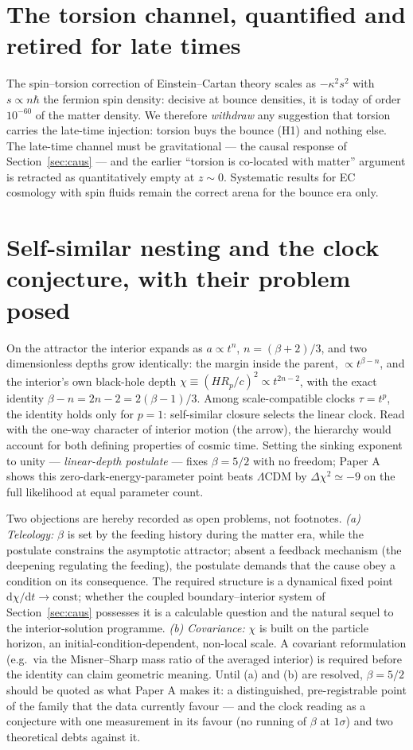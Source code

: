 \documentclass[11pt]{article}
\begin{document}
\section{The torsion channel, quantified and retired for late times}
The spin--torsion correction of Einstein--Cartan theory scales as $-\kappa^2 s^2$ with $s \propto n\hbar$ the fermion spin density: decisive at bounce densities, it is today of order $10^{-60}$ of the matter density. We therefore \emph{withdraw} any suggestion that torsion carries the late-time injection: torsion buys the bounce (H1) and nothing else. The late-time channel must be gravitational --- the causal response of Section~\ref{sec:caus} --- and the earlier ``torsion is co-located with matter'' argument is retracted as quantitatively empty at $z \sim 0$. Systematic results for EC cosmology with spin fluids \cite{ECtheorems} remain the correct arena for the bounce era only.

\section{Self-similar nesting and the clock conjecture, with their problem posed}
On the attractor the interior expands as $a \propto t^{n}$, $n = (\beta+2)/3$, and two dimensionless depths grow identically: the margin inside the parent, $\propto t^{\beta - n}$, and the interior's own black-hole depth $\chi \equiv (H R_p/c)^2 \propto t^{2n-2}$, with the exact identity $\beta - n = 2n - 2 = 2(\beta-1)/3$. Among scale-compatible clocks $\tau = t^{p}$, the identity holds only for $p = 1$: self-similar closure selects the linear clock. Read with the one-way character of interior motion (the arrow), the hierarchy would account for both defining properties of cosmic time. Setting the sinking exponent to unity --- \emph{linear-depth postulate} --- fixes $\beta = 5/2$ with no freedom; Paper A shows this zero-dark-energy-parameter point beats $\Lambda$CDM by $\Delta\chi^2 \simeq -9$ on the full likelihood at equal parameter count.

Two objections are hereby recorded as open problems, not footnotes. \emph{(a) Teleology:} $\beta$ is set by the feeding history during the matter era, while the postulate constrains the asymptotic attractor; absent a feedback mechanism (the deepening regulating the feeding), the postulate demands that the cause obey a condition on its consequence. The required structure is a dynamical fixed point $\mathrm{d}\chi/\mathrm{d}t \to \mathrm{const}$; whether the coupled boundary--interior system of Section~\ref{sec:caus} possesses it is a calculable question and the natural sequel to the interior-solution programme. \emph{(b) Covariance:} $\chi$ is built on the particle horizon, an initial-condition-dependent, non-local scale. A covariant reformulation (e.g.\ via the Misner--Sharp mass ratio of the averaged interior) is required before the identity can claim geometric meaning. Until (a) and (b) are resolved, $\beta = 5/2$ should be quoted as what Paper A makes it: a distinguished, pre-registrable point of the family that the data currently favour --- and the clock reading as a conjecture with one measurement in its favour (no running of $\beta$ at $1\sigma$) and two theoretical debts against it.
\end{document}
